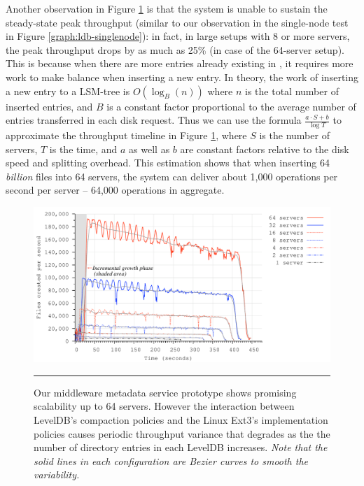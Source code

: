 Another observation in Figure \ref{graph:ldb-scaling} is that the system is
unable to sustain the steady-state peak throughput (similar to our observation
in the single-node test in Figure \ref{graph:ldb-singlenode}): 
in fact, in large setups with 8 or more servers, 
the peak throughput drops by as much as 25\% (in case of the 64-server setup).
This is because when there are more entries already existing in \ldb, 
it requires more work to make \ldb balance when inserting a new entry.
In theory, the work of inserting a new entry to a LSM-tree is $O(\log_{B}(n))$
where $n$ is the total number of inserted entries, and $B$ is a constant factor
proportional to the average number of entries transferred in each disk request. 
Thus we can use the formula $\frac{a\cdot S+b}{\log{T}}$ to approximate the 
throughput timeline in Figure \ref{graph:ldb-scaling}, where $S$ is the number 
of servers, $T$ is the time, and $a$ as well as $b$ are constant factors relative 
to the disk speed and splitting overhead.
This estimation shows that when inserting 64 \textit{billion} files into 64 
servers, the system can deliver about 1,000 operations per second per server -- 
64,000 operations in aggregate. 

\begin{figure}[t]  %
\centerline{\includegraphics[scale=0.33]{./figs/ldb_insertrate}}
\caption{
{\small
Our middleware metadata service prototype shows promising scalability
up to 64 servers. However the interaction between LevelDB's compaction policies and 
the Linux Ext3's implementation policies causes periodic throughput variance
that degrades as the the number of directory entries in each LevelDB
increases. \textit{Note that the solid lines in each configuration are Bezier
curves to smooth the variability.}
}
}
\vspace{10pt}
\hrule 
\label{graph:ldb-scaling}
\end{figure}       %

